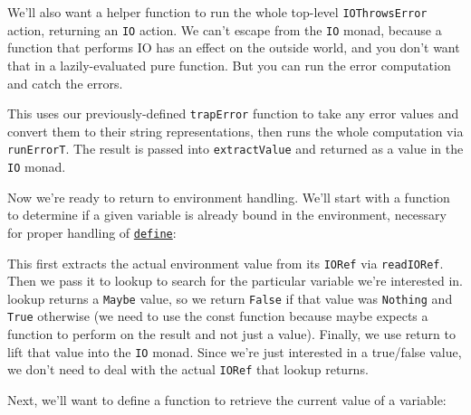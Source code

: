 We'll also want a helper function to run the whole top-level \verb|IOThrowsError| action, returning an \verb|IO| action. We can't escape from the \verb|IO| monad, because a function that performs IO has an effect on the outside world, and you don't want that in a lazily-evaluated pure function. But you can run the error computation and catch the errors.
 
 
This uses our previously-defined \verb|trapError| function to take any error values and convert them to their string representations, then runs the whole computation via \verb|runErrorT|. The result is passed into \verb|extractValue| and returned as a value in the \verb|IO| monad.
 
Now we're ready to return to environment handling. We'll start with a function to determine if a given variable is already bound in the environment, necessary for proper handling of \href{http://www.schemers.org/Documents/Standards/R5RS/HTML/r5rs-Z-H-8.html\#\%_sec_5.2}{\texttt{define}}:
 
 
This first extracts the actual environment value from its \verb|IORef| via \verb|readIORef|. Then we pass it to lookup to search for the particular variable we're interested in. lookup returns a \verb|Maybe| value, so we return \verb|False| if that value was \verb|Nothing| and \verb|True| otherwise (we need to use the const function because maybe expects a function to perform on the result and not just a value). Finally, we use return to lift that value into the \verb|IO| monad. Since we're just interested in a true/false value, we don't need to deal with the actual \verb|IORef| that lookup returns.
 
Next, we'll want to define a function to retrieve the current value of a variable:
 
 
